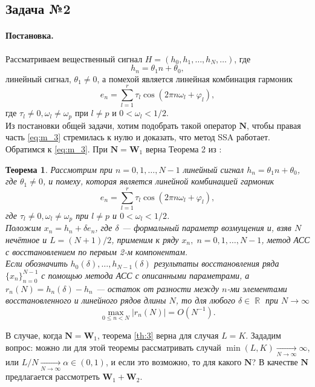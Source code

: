 \documentclass[specialist,
substylefile = spbu_report.rtx,
subf,href,colorlinks=true, 12pt]{disser}
\DeclareMathOperator\R{\mathbb{R}}
\newtheorem{theorem}{Теорема}
\newenvironment{statement}{\paragraph{Постановка.}}{\hfill}
\begin{document}
	\subsection{Задача №2}
	\begin{statement}
		Рассматриваем вещественный сигнал $H = (h_0, h_1, \dots, h_N, \dots)$, где 
		\begin{equation*}
			h_n = \theta_1n+\theta_0,
		\end{equation*}
		линейный сигнал, $\theta_1\neq0$, а помехой является линейная комбинация гармоник
		\begin{equation*}
			e_n = \sum^r_{l=1}\tau_l\cos(2\pi n\omega_l + \varphi_l),
		\end{equation*} 
		где $\tau_l\neq0, \omega_l \neq \omega_p$ при $l\neq p$ и $0 < \omega_l < 1/2$.
		\\Из постановки общей задачи, хотим подобрать такой оператор $\mathbf{N}$, чтобы правая часть \eqref{eq:m_3} стремилась к нулю и доказать, что метод SSA работает.
		\\Обратимся к \eqref{eq:m_3}. При $\mathbf{N} = \mathbf{W}_1$ верна Теорема 2 из \cite{ZNekrutkin}:
		\begin{theorem}\label{th:3}
			Рассмотрим при $n=0,1,\dots,N-1$ линейный сигнал $h_n = \theta_1n+\theta_0$, где $\theta_1 \neq 0$, и помеху, которая является линейной комбинацией гармоник
			\begin{equation*}
				e_n = \sum^r_{l=1}\tau_l\cos(2\pi n\omega_l + \varphi_l),
			\end{equation*} 
			\emph{где} $\tau_l\neq0, \omega_l \neq \omega_p$ \emph{при} $l\neq p$ и $0 < \omega_l < 1/2$.\\
			Положим $x_n = h_n + \delta e_n$, где $\delta$ --- формальный параметр возмущения и, взяв $N$ нечётное и $L = (N+1)/2$, применим к ряду $x_n,\; n=0,1,\dots, N-1$, метод АСС с восстановлением по первым 2-м компонентам.\\
			Если обозначить $h_0(\delta),\dots, h_{N-1}(\delta)$ результаты восстановления ряда $\{x_n\}^{N-1}_{n=0}$ с помощью метода АСС с описанными параметрами, а $r_n(N)=h_n(\delta)-h_n$ --- остаток от разности между $n$-ми элементами восстановленного и линейного рядов длины $N$, то для любого $\delta\in\R$ при $N\rightarrow\infty$
			\begin{equation*}
				\max_{0\leqslant n<N}|r_n(N)|=O(N^{-1}).
			\end{equation*}
		\end{theorem}
		В случае, когда $\mathbf{N} = \mathbf{W}_1$, теорема \eqref{th:3} верна для случая $L=K$. Зададим вопрос: можно ли для этой теоремы рассматривать случай $\min(L,K)\underset{N\rightarrow\infty}{\longrightarrow}\infty$, или $L/N\underset{N\rightarrow\infty}{\longrightarrow}\alpha\in(0,1)$, и если это возможно, то для какого $\mathbf{N}$? В качестве $\mathbf{N}$ предлагается рассмотреть $\mathbf{W}_1 + \mathbf{W}_2$. 
	\end{statement}
\end{document}

